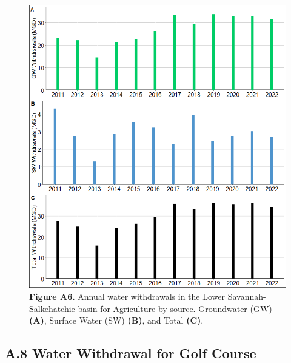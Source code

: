 \documentclass[
]{article}
\begin{document}
\begin{figure}[H]

{\centering \includegraphics{LSS_figures/trend-Ag_bar-plot-1} 

}

\caption{\textbf{Figure A6.} Annual water withdrawals in the Lower Savannah-Salkehatchie basin for Agriculture by source. Groundwater (GW) \textbf{(A)}, Surface Water (SW) \textbf{(B)}, and Total \textbf {(C)}.}\label{fig:trend-Ag_bar-plot}
\end{figure}

\hypertarget{a.8-water-withdrawal-for-golf-course}{%
\subsection{A.8 Water Withdrawal for Golf
Course}\label{a.8-water-withdrawal-for-golf-course}}
\end{document}
